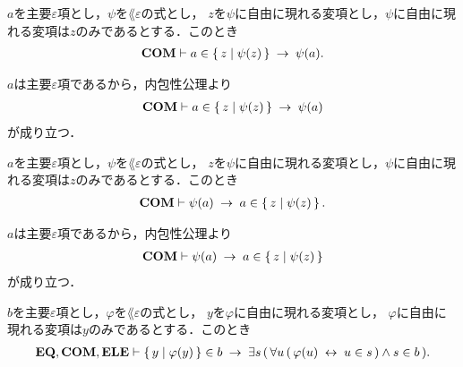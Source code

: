 	\begin{screen}
		\begin{thm}
		\label{thm:equivalent_formula_rewriting_7}
			$a$を主要$\varepsilon$項とし，$\psi$を$\lang{\varepsilon}$の式とし，
			$z$を$\psi$に自由に現れる変項とし，$\psi$に自由に現れる変項は$z$のみであるとする．このとき
			\begin{align}
				\mbox{\bf COM} \vdash a \in \left\{\, z \mid \psi(z)\, \right\} \hspace{0.25em}\rightarrow\hspace{0.25em} \psi(a).
			\end{align}
		\end{thm}
	\end{screen}
	
	\begin{sketch}
		$a$は主要$\varepsilon$項であるから，内包性公理より
		\begin{align}
			\mbox{\bf COM} \vdash a \in \left\{\, z \mid \psi(z)\, \right\} \hspace{0.25em}\rightarrow\hspace{0.25em} \psi(a)
		\end{align}
		が成り立つ．
		\QED
	\end{sketch}
	
	\begin{screen}
		\begin{thm}
		\label{thm:equivalent_formula_rewriting_8}
			$a$を主要$\varepsilon$項とし，$\psi$を$\lang{\varepsilon}$の式とし，
			$z$を$\psi$に自由に現れる変項とし，$\psi$に自由に現れる変項は$z$のみであるとする．このとき
			\begin{align}
				\mbox{\bf COM} \vdash \psi(a) \hspace{0.25em}\rightarrow\hspace{0.25em} a \in \left\{\, z \mid \psi(z)\, \right\}.
			\end{align}
		\end{thm}
	\end{screen}
	
	\begin{sketch}
		$a$は主要$\varepsilon$項であるから，内包性公理より
		\begin{align}
			\mbox{\bf COM} \vdash \psi(a) \hspace{0.25em}\rightarrow\hspace{0.25em} a \in \left\{\, z \mid \psi(z)\, \right\}
		\end{align}
		が成り立つ．
		\QED
	\end{sketch}
	
	\begin{screen}
		\begin{thm}
		\label{thm:equivalent_formula_rewriting_9}
			$b$を主要$\varepsilon$項とし，$\varphi$を$\lang{\varepsilon}$の式とし，
			$y$を$\varphi$に自由に現れる変項とし，
			$\varphi$に自由に現れる変項は$y$のみであるとする．このとき
			\begin{align}
				\mbox{{\bf EQ}},\mbox{\bf COM},\mbox{{\bf ELE}} \vdash \left\{\, y \mid \varphi(y)\, \right\} \in b
				\hspace{0.25em}\rightarrow\hspace{0.25em} \exists s\, (\, 
				\forall u\, (\, \varphi(u) \hspace{0.25em}\leftrightarrow\hspace{0.25em} u \in s\, )
				\wedge s \in b\, ).
			\end{align}
		\end{thm}
	\end{screen}
	
